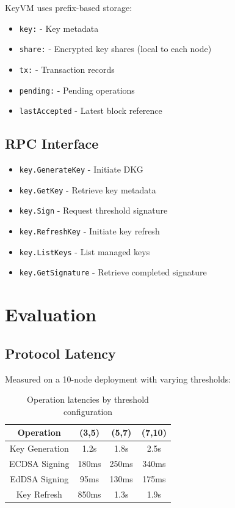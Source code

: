 \documentclass[11pt,twocolumn]{article}
\begin{document}
KeyVM uses prefix-based storage:

\begin{itemize}
\item \texttt{key:} - Key metadata
\item \texttt{share:} - Encrypted key shares (local to each node)
\item \texttt{tx:} - Transaction records
\item \texttt{pending:} - Pending operations
\item \texttt{lastAccepted} - Latest block reference
\end{itemize}

\subsection{RPC Interface}

\begin{itemize}
\item \texttt{key.GenerateKey} - Initiate DKG
\item \texttt{key.GetKey} - Retrieve key metadata
\item \texttt{key.Sign} - Request threshold signature
\item \texttt{key.RefreshKey} - Initiate key refresh
\item \texttt{key.ListKeys} - List managed keys
\item \texttt{key.GetSignature} - Retrieve completed signature
\end{itemize}

\section{Evaluation}

\subsection{Protocol Latency}

Measured on a 10-node deployment with varying thresholds:

\begin{table}[h]
\centering
\begin{tabular}{|c|c|c|c|}
\hline
\textbf{Operation} & \textbf{(3,5)} & \textbf{(5,7)} & \textbf{(7,10)} \\
\hline
Key Generation & 1.2s & 1.8s & 2.5s \\
ECDSA Signing & 180ms & 250ms & 340ms \\
EdDSA Signing & 95ms & 130ms & 175ms \\
Key Refresh & 850ms & 1.3s & 1.9s \\
\hline
\end{tabular}
\caption{Operation latencies by threshold configuration}
\end{table}
\end{document}
